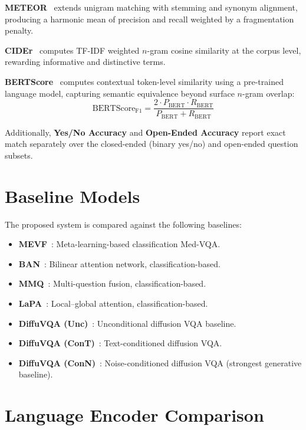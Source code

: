 \documentclass[9pt]{report}
\begin{document}
\textbf{METEOR}~\cite{meteor} extends unigram matching with stemming and synonym alignment, producing a harmonic mean of precision and recall weighted by a fragmentation penalty.

\textbf{CIDEr}~\cite{cider} computes TF-IDF weighted $n$-gram cosine similarity at the corpus level, rewarding informative and distinctive terms.

\textbf{BERTScore}~\cite{bertscore} computes contextual token-level similarity using a pre-trained language model, capturing semantic equivalence beyond surface $n$-gram overlap:
\begin{equation}
    \text{BERTScore}_{\text{F1}} = \frac{2 \cdot P_{\text{BERT}} \cdot R_{\text{BERT}}}{P_{\text{BERT}} + R_{\text{BERT}}}
\end{equation}

Additionally, \textbf{Yes/No Accuracy} and \textbf{Open-Ended Accuracy} report exact match separately over the closed-ended (binary yes/no) and open-ended question subsets.

\section{Baseline Models}

The proposed system is compared against the following baselines:

\begin{itemize}
    \item \textbf{MEVF}~\cite{mevf}: Meta-learning-based classification Med-VQA.
    \item \textbf{BAN}~\cite{ban}: Bilinear attention network, classification-based.
    \item \textbf{MMQ}~\cite{mmq}: Multi-question fusion, classification-based.
    \item \textbf{LaPA}~\cite{lapa}: Local--global attention, classification-based.
    \item \textbf{DiffuVQA (Unc)}~\cite{diffuvqa}: Unconditional diffusion VQA baseline.
    \item \textbf{DiffuVQA (ConT)}~\cite{diffuvqa}: Text-conditioned diffusion VQA.
    \item \textbf{DiffuVQA (ConN)}~\cite{diffuvqa}: Noise-conditioned diffusion VQA (strongest generative baseline).
\end{itemize}

\section{Language Encoder Comparison}
\end{document}
